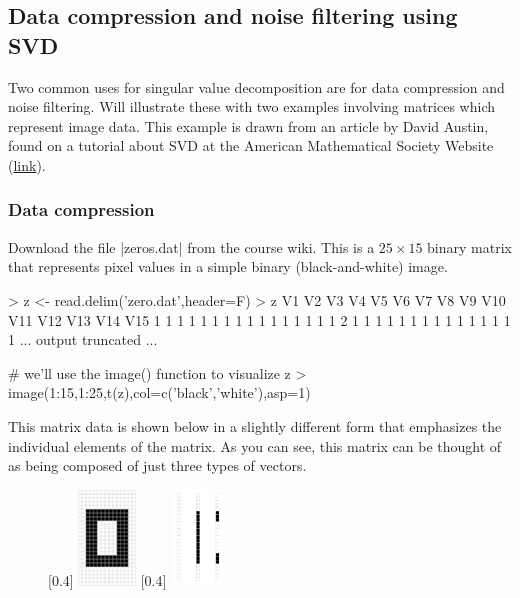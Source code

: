 \subsection{Data compression and noise filtering using SVD}

Two common uses for singular value decomposition are for data compression and noise filtering. Will illustrate these with two examples involving matrices which represent image data. This example is drawn from an article by David Austin, found on a tutorial about SVD at the American Mathematical Society Website (\href{http://www.ams.org/samplings/feature-column/fcarc-svd}{link}).

\subsubsection{Data compression}

Download the file |zeros.dat| from the course wiki. This is a $25 \times 15$ binary matrix that represents pixel values in a simple binary (black-and-white) image.

\begin{R}
> z <- read.delim('zero.dat',header=F)
> z
   V1 V2 V3 V4 V5 V6 V7 V8 V9 V10 V11 V12 V13 V14 V15
1   1  1  1  1  1  1  1  1  1   1   1   1   1   1   1
2   1  1  1  1  1  1  1  1  1   1   1   1   1   1   1
... output truncated ...

# we'll use the image() function to visualize z
> image(1:15,1:25,t(z),col=c('black','white'),asp=1)    
\end{R}

This matrix data is shown below in a slightly different form that emphasizes the individual elements of the matrix.  As you can see, this matrix can be thought of as being composed of just three types of vectors.


\begin{figure}[ht!]
\begin{center}
[0.4\linewidth]{%
\includegraphics[height=1in]{./figures/hands-on7/zero.jpg}%
}
[0.4\linewidth]{%
\includegraphics[height=1in]{./figures/hands-on7/zero-vecs.jpg}%
}
\end{center}
\end{figure}

